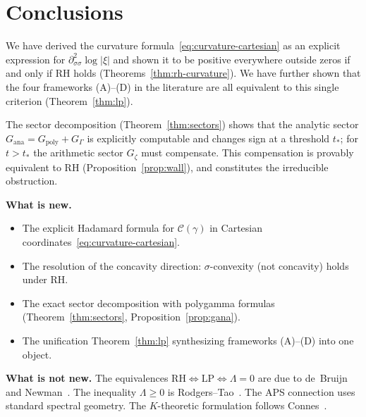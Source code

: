 \documentclass[11pt]{amsart}
\newcommand{\LP}{\mathrm{LP}}
\begin{document}
\section{Conclusions}
\label{sec:conclusions}

We have derived the curvature formula~\eqref{eq:curvature-cartesian} as an explicit
expression for $\partial^2_{\sigma\sigma}\log|\xi|$ and shown it to be positive everywhere
outside zeros if and only if RH holds (Theorems~\ref{thm:rh-curvature}).  We have
further shown that the four frameworks (A)--(D) in the literature are all equivalent
to this single criterion (Theorem~\ref{thm:lp}).

The sector decomposition (Theorem~\ref{thm:sectors}) shows that the analytic sector
$G_{\mathrm{ana}} = G_{\mathrm{poly}} + G_\Gamma$ is explicitly computable and changes sign
at a threshold $t_*$; for $t > t_*$ the arithmetic sector $G_\zeta$ must compensate.
This compensation is provably equivalent to RH (Proposition~\ref{prop:wall}), and
constitutes the irreducible obstruction.

\medskip

\noindent\textbf{What is new.}
\begin{itemize}
  \item The explicit Hadamard formula for $\mathcal{C}(\gamma)$ in Cartesian coordinates~\eqref{eq:curvature-cartesian}.
  \item The resolution of the concavity direction: $\sigma$-convexity (not concavity) holds under RH.
  \item The exact sector decomposition with polygamma formulas (Theorem~\ref{thm:sectors},
    Proposition~\ref{prop:gana}).
  \item The unification Theorem~\ref{thm:lp} synthesizing frameworks (A)--(D) into one object.
\end{itemize}

\noindent\textbf{What is not new.}
The equivalences $\mathrm{RH}\iff\LP\iff\Lambda=0$ are due to de~Bruijn~\cite{deBruijn1950}
and Newman~\cite{Newman1976}.  The inequality $\Lambda\ge0$ is Rodgers--Tao~\cite{RodgersTao2020}.
The APS connection uses standard spectral geometry.  The $K$-theoretic formulation
follows Connes~\cite{Connes1999}.
\end{document}
